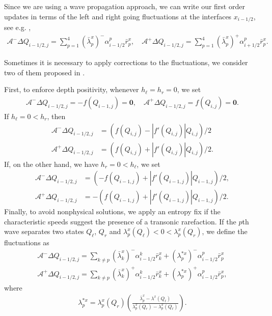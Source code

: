\documentclass[12pt]{article}
\begin{document}
Since we are using a wave propagation approach, we can write our first order updates in terms of the left and right going fluctuations at the interfaces $x_{i-1/2}$, see e.g. \cite[Section 15.3]{leveque2002finite},
\begin{align}
    \mathcal{A}^{-}\Delta Q_{i-1/2,j}=\sum_{p=1}^4(\bar{\lambda}^x_p)^{-}\alpha^p_{i-1/2}\bar{r}^x_p, \quad
    \mathcal{A}^{+}\Delta Q_{i-1/2,j}=\sum_{p=1}^4(\bar{\lambda}^x_p)^{+}\alpha^p_{i+1/2}\bar{r}^x_p.
\end{align}

Sometimes it is necessary to apply corrections to the fluctuations, we consider two of them proposed in \cite{monthe1999positivity}.

First, to enforce depth positivity, whenever $h_\ell=h_r=0$,  we set 
\begin{align}
    \mathcal{A}^{-}\Delta Q_{i-1/2,j}=-f(Q_{i-1,j})=\mathbf{0},\quad \mathcal{A}^{+}\Delta Q_{i-1/2,j}=f(Q_{i,j})=\mathbf{0}.
\end{align}
If $h_\ell=0<h_r$, then
\begin{align}
    \mathcal{A}^{-}\Delta Q_{i-1/2,j}&=(f(Q_{i,j})-|f'(Q_{i,j})|Q_{i,j})/2\\%
    \mathcal{A}^{+}\Delta Q_{i-1/2,j}&=(f(Q_{i,j})+|f'(Q_{i,j})|Q_{i,j})/2.
\end{align}
If, on the other hand, we have $h_r=0<h_\ell$, we set
\begin{align}
    \mathcal{A}^{-}\Delta Q_{i-1/2,j}&=(-f(Q_{i-1,j})+|f'(Q_{i-1,j})|Q_{i-1,j})/2,\\
    \mathcal{A}^{+}\Delta Q_{i-1/2,j}&=-(f(Q_{i-1,j})+|f'(Q_{i-1,j})|Q_{i-1,j})/2.%
\end{align}
Finally, to avoid nonphysical solutions, we apply an entropy fix if the characteristic speeds suggest the presence of a transonic rarefaction.
If the $p$th wave separates two states $Q_\ell$, $Q_r$ and $\lambda^x_p(Q_\ell)<0<\lambda^x_p(Q_r)$, we define the fluctuations as
\begin{align}
    \mathcal{A}^{-}\Delta Q_{i-1/2,j}=\sum_{k\neq p}(\bar{\lambda}^x_k)^{-}\alpha^k_{i-1/2}\bar{r}^x_k+(\lambda^{*x}_p)^{-}\alpha^p_{i-1/2}\bar{r}^x_p\\
    \mathcal{A}^{+}\Delta Q_{i-1/2,j}=\sum_{k\neq p}(\bar{\lambda}^x_k)^{+}\alpha^k_{i-1/2}\bar{r}^x_k+(\lambda^{*x}_p)^{+}\alpha^p_{i-1/2}\bar{r}^x_p,
\end{align}
where
\begin{align}
    \lambda^{*x}_p=\lambda^x_p(Q_r)\left(\frac{\bar{\lambda}^x_p-\lambda^x(Q_\ell)}{\lambda^x_p(Q_r)-\lambda^x_p(Q_\ell)}\right).
\end{align}
\end{document}
